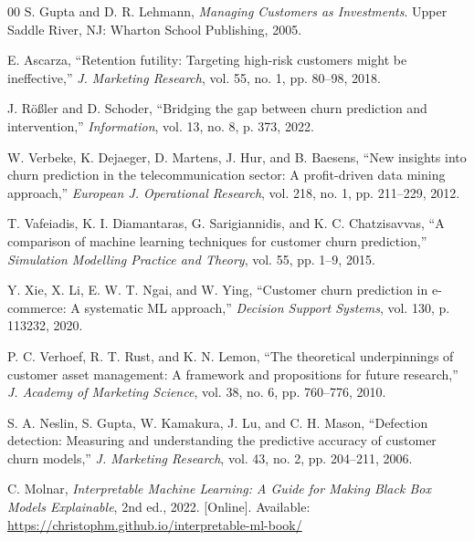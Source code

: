 \documentclass[conference]{IEEEtran}
\begin{document}
\begin{thebibliography}{00}
S. Gupta and D. R. Lehmann, \textit{Managing Customers as Investments}. Upper Saddle River, NJ: Wharton School Publishing, 2005.

E. Ascarza, ``Retention futility: Targeting high-risk customers might be ineffective,'' \textit{J. Marketing Research}, vol. 55, no. 1, pp. 80--98, 2018.

J. Rößler and D. Schoder, ``Bridging the gap between churn prediction and intervention,'' \textit{Information}, vol. 13, no. 8, p. 373, 2022.

W. Verbeke, K. Dejaeger, D. Martens, J. Hur, and B. Baesens, ``New insights into churn prediction in the telecommunication sector: A profit-driven data mining approach,'' \textit{European J. Operational Research}, vol. 218, no. 1, pp. 211--229, 2012.

T. Vafeiadis, K. I. Diamantaras, G. Sarigiannidis, and K. C. Chatzisavvas, ``A comparison of machine learning techniques for customer churn prediction,'' \textit{Simulation Modelling Practice and Theory}, vol. 55, pp. 1--9, 2015.

Y. Xie, X. Li, E. W. T. Ngai, and W. Ying, ``Customer churn prediction in e-commerce: A systematic ML approach,'' \textit{Decision Support Systems}, vol. 130, p. 113232, 2020.

P. C. Verhoef, R. T. Rust, and K. N. Lemon, ``The theoretical underpinnings of customer asset management: A framework and propositions for future research,'' \textit{J. Academy of Marketing Science}, vol. 38, no. 6, pp. 760--776, 2010.

S. A. Neslin, S. Gupta, W. Kamakura, J. Lu, and C. H. Mason, ``Defection detection: Measuring and understanding the predictive accuracy of customer churn models,'' \textit{J. Marketing Research}, vol. 43, no. 2, pp. 204--211, 2006.

C. Molnar, \textit{Interpretable Machine Learning: A Guide for Making Black Box Models Explainable}, 2nd ed., 2022. [Online]. Available: \url{https://christophm.github.io/interpretable-ml-book/}

\end{thebibliography}
\end{document}

